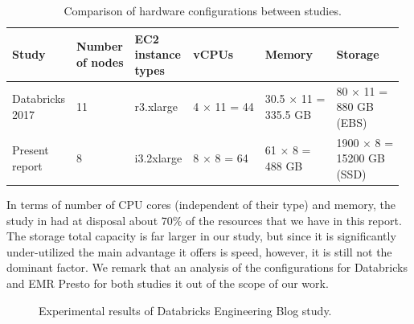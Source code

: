 \begin{table}
  \centering
	\begin{tabular}{|l|l|l|l|l|l|}
	  \hline
		\textbf{Study} & \makecell[l]{\bf Number \\ \bf of nodes} & \makecell[l]{\bf EC2 \\ \bf instance \\ \bf types} & \textbf{vCPUs} & \textbf{Memory} & \textbf{Storage} \\ \hline
		\makecell[l]{Databricks \\ 2017} & 11 & r3.xlarge & 4 × 11 = 44 & \makecell[l]{30.5 × 11 = \\ 335.5 GB} & \makecell[l]{80 × 11 = \\ 880 GB \\ (EBS)} \\ \hline
		\makecell[l]{Present \\ report} & 8 & i3.2xlarge & 8 × 8 = 64 & \makecell[l]{61 × 8 = \\ 488 GB} & \makecell[l]{1900 × 8 = \\ 15200 GB \\ (SSD)} \\ \hline
	\end{tabular}
	\caption{Comparison of hardware configurations between studies.}
	\label{table:comparisonStudiesConfigurations}
\end{table}

In terms of number of CPU cores (independent of their type) and memory, the study in \cite{databricksReport} had at disposal about 70\% of the resources that we have in this report. The storage total capacity is far larger in our study, but since it is significantly under-utilized the main advantage it offers is speed, however, it is still not the dominant factor. We remark that an analysis of the configurations for Databricks and EMR Presto for both studies it out of the scope of our work.

\begin{figure}
   \begin{center}
   \end{center}
   \caption{Experimental results of Databricks Engineering Blog study.}
   \label{fig:validationExperimentsDatabricksBlogGraph}
\end{figure}


